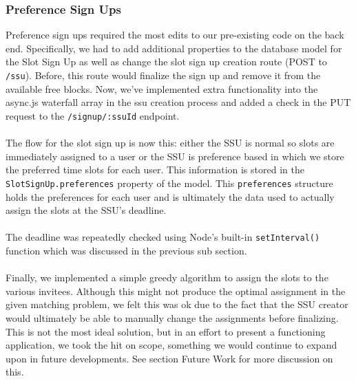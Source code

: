 \documentclass[11pt]{article}   %
\begin{document}
\subsubsection*{Preference Sign Ups}
Preference sign ups required the most edits to our pre-existing code on the back end. Specifically, we had to add additional properties to the database model for the Slot Sign Up as well as change the slot sign up creation route (POST to \texttt{/ssu}). Before, this route would finalize the sign up and remove it from the available free blocks. Now, we've implemented extra functionality into the async.js waterfall array in the ssu creation process and added a check in the PUT request to the \texttt{/signup/:ssuId} endpoint.\\~\\
The flow for the slot sign up is now this: either the SSU is normal so slots are immediately assigned to a user or the SSU is preference based in which we store the preferred time slots for each user. This information is stored in the \texttt{SlotSignUp.preferences} property of the model. This \texttt{preferences} structure holds the preferences for each user and is ultimately the data used to actually assign the slots at the SSU's deadline.\\~\\
The deadline was repeatedly checked using Node's built-in \texttt{setInterval()} function which was discussed in the previous sub section. \\~\\
Finally, we implemented a simple greedy algorithm to assign the slots to the various invitees. Although this might not produce the optimal assignment in the given matching problem, we felt this was ok due to the fact that the SSU creator would ultimately be able to manually change the assignments before finalizing. This is not the most ideal solution, but in an effort to present a functioning application, we took the hit on scope, something we would continue to expand upon in future developments. See section Future Work for more discussion on this. 
\end{document}
